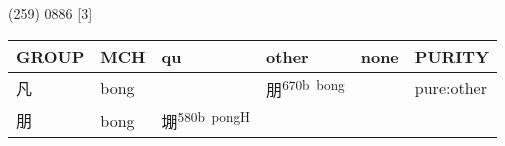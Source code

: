 \documentclass[14pt,a4paper]{scrartcl}
\begin{document}
(259) 0886 {[}3{]}

\begin{longtable}[c]{@{}llllll@{}}
\toprule
\begin{minipage}[b]{0.14\columnwidth}\raggedright\strut
GROUP
\strut\end{minipage} &
\begin{minipage}[b]{0.14\columnwidth}\raggedright\strut
MCH
\strut\end{minipage} &
\begin{minipage}[b]{0.14\columnwidth}\raggedright\strut
qu
\strut\end{minipage} &
\begin{minipage}[b]{0.14\columnwidth}\raggedright\strut
other
\strut\end{minipage} &
\begin{minipage}[b]{0.14\columnwidth}\raggedright\strut
none
\strut\end{minipage} &
\begin{minipage}[b]{0.14\columnwidth}\raggedright\strut
PURITY
\strut\end{minipage}\tabularnewline
\midrule
\endhead
\begin{minipage}[t]{0.14\columnwidth}\raggedright\strut
凡
\strut\end{minipage} &
\begin{minipage}[t]{0.14\columnwidth}\raggedright\strut
bong
\strut\end{minipage} &
\begin{minipage}[t]{0.14\columnwidth}\raggedright\strut
\strut\end{minipage} &
\begin{minipage}[t]{0.14\columnwidth}\raggedright\strut
朋\textsuperscript{670b~bong}
\strut\end{minipage} &
\begin{minipage}[t]{0.14\columnwidth}\raggedright\strut
\strut\end{minipage} &
\begin{minipage}[t]{0.14\columnwidth}\raggedright\strut
pure:other
\strut\end{minipage}\tabularnewline
\begin{minipage}[t]{0.14\columnwidth}\raggedright\strut
朋
\strut\end{minipage} &
\begin{minipage}[t]{0.14\columnwidth}\raggedright\strut
bong
\strut\end{minipage} &
\begin{minipage}[t]{0.14\columnwidth}\raggedright\strut
堋\textsuperscript{580b~pongH}

\end{minipage}
\end{longtable}
\end{document}
